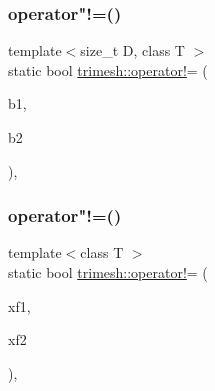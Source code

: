 \mbox{\label{namespacetrimesh_a8c828bc153a668d172ff22788f17d5a9}} 
\subsubsection{\texorpdfstring{operator"!=()}{operator!=()}\hspace{0.1cm}{\footnotesize\ttfamily [1/3]}}
{\footnotesize\ttfamily template$<$size\+\_\+t D, class T $>$ \\
static bool \hyperlink{namespacetrimesh_af767195cb37f08a930059365eb736329}{trimesh\+::operator!}= (\begin{DoxyParamCaption}\item[{const \hyperlink{classtrimesh_1_1Box}{Box}$<$ D, T $>$ \&}]{b1,  }\item[{const \hyperlink{classtrimesh_1_1Box}{Box}$<$ D, T $>$ \&}]{b2 }\end{DoxyParamCaption})\hspace{0.3cm}{\ttfamily [inline]}, {\ttfamily [static]}}

\mbox{\label{namespacetrimesh_af68c94d9209a2ccfd35ba698a1385be4}} 
\subsubsection{\texorpdfstring{operator"!=()}{operator!=()}\hspace{0.1cm}{\footnotesize\ttfamily [2/3]}}
{\footnotesize\ttfamily template$<$class T $>$ \\
static bool \hyperlink{namespacetrimesh_af767195cb37f08a930059365eb736329}{trimesh\+::operator!}= (\begin{DoxyParamCaption}\item[{const \hyperlink{classtrimesh_1_1XForm}{X\+Form}$<$ T $>$ \&}]{xf1,  }\item[{const \hyperlink{classtrimesh_1_1XForm}{X\+Form}$<$ T $>$ \&}]{xf2 }\end{DoxyParamCaption})\hspace{0.3cm}{\ttfamily [inline]}, {\ttfamily [static]}}

\mbox{\label{namespacetrimesh_a814e6a0f8e45dcbef63cd0ec2ddef1ff}} 
